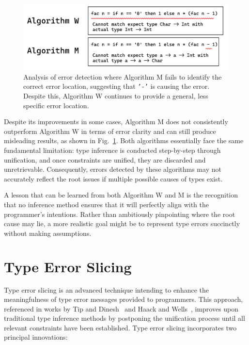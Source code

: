 \begin{figure}[hbt]
\centering  \includegraphics[width=0.8\linewidth]{AlgorithmWM2}
  \caption{
    \label{fig:algorithm-m-2}
    Analysis of error detection where Algorithm M fails to identify the correct error location, suggesting that \texttt{'-'} is causing the error. Despite this, Algorithm W continues to provide a general, less specific error location.}
\end{figure}


Despite its improvements in some cases, Algorithm M does not consistently outperform Algorithm W in terms of error clarity and can still produce misleading results, as shown in Fig.~\ref{fig:algorithm-m-2}. Both algorithms essentially face the same fundamental limitation: type inference is conducted step-by-step through unification, and once constraints are unified, they are discarded and unretrievable. Consequently, errors detected by these algorithms may not accurately reflect the root issues if multiple possible causes of types exist.

A lesson that can be learned from both Algorithm W and M is the recognition that no inference method ensures that it will perfectly align with the programmer’s intentions. Rather than ambitiously pinpointing where the root cause may lie, a more realistic goal might be to represent type errors succinctly without making assumptions.


\section{Type Error Slicing}

Type error slicing is an advanced technique intending to enhance the meaningfulness of type error messages provided to programmers. This approach, referenced in works by Tip and Dinesh~\cite{Tip2001-qn} and Haack and Wells~\cite{Haack2004-fr}, improves upon traditional type inference methods by postponing the unification process until all relevant constraints have been established. Type error slicing incorporates two principal innovations:


